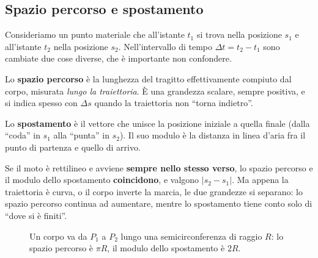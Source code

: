 \subsection{Spazio percorso e spostamento}
Consideriamo un punto materiale che all'istante $t_1$ si trova nella posizione $s_1$ e all'istante $t_2$ nella posizione $s_2$. Nell'intervallo di tempo $\Delta t = t_2 - t_1$ sono cambiate due cose diverse, che è importante non confondere.

\begin{definizione}
Lo \textbf{spazio percorso} è la lunghezza del tragitto effettivamente compiuto dal corpo, misurata \emph{lungo la traiettoria}. È una grandezza scalare, sempre positiva, e si indica spesso con $\Delta s$ quando la traiettoria non ``torna indietro''.

Lo \textbf{spostamento} è il vettore che unisce la posizione iniziale a quella finale (dalla ``coda'' in $s_1$ alla ``punta'' in $s_2$). Il suo modulo è la distanza in linea d'aria fra il punto di partenza e quello di arrivo.
\end{definizione}

Se il moto è rettilineo e avviene \textbf{sempre nello stesso verso}, lo spazio percorso e il modulo dello spostamento \textbf{coincidono}, e valgono $|s_2 - s_1|$. Ma appena la traiettoria è curva, o il corpo inverte la marcia, le due grandezze si separano: lo spazio percorso continua ad aumentare, mentre lo spostamento tiene conto solo di ``dove si è finiti''.

\begin{figure}[!htbp]
    \centering
    \caption{Un corpo va da $P_1$ a $P_2$ lungo una semicirconferenza di raggio $R$: lo spazio percorso è $\pi R$, il modulo dello spostamento è $2R$.}
    \label{fig:percorso-spostamento}
\end{figure}

